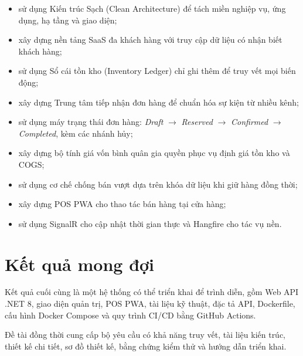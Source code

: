 \begin{itemize}
    \item sử dụng Kiến trúc Sạch (Clean Architecture) để tách miền nghiệp vụ, ứng dụng, hạ tầng và giao diện;
    \item xây dựng nền tảng SaaS đa khách hàng với truy cập dữ liệu có nhận biết khách hàng;
    \item sử dụng Sổ cái tồn kho (Inventory Ledger) chỉ ghi thêm để truy vết mọi biến động;
    \item xây dựng Trung tâm tiếp nhận đơn hàng để chuẩn hóa sự kiện từ nhiều kênh;
    \item sử dụng máy trạng thái đơn hàng: \textit{Draft} $\rightarrow$ \textit{Reserved}
          $\rightarrow$ \textit{Confirmed} $\rightarrow$ \textit{Completed}, kèm các nhánh hủy;
    \item xây dựng bộ tính giá vốn bình quân gia quyền phục vụ định giá tồn kho và COGS;
    \item sử dụng cơ chế chống bán vượt dựa trên khóa dữ liệu khi giữ hàng đồng thời;
    \item xây dựng POS PWA cho thao tác bán hàng tại cửa hàng;
    \item sử dụng SignalR cho cập nhật thời gian thực và Hangfire cho tác vụ nền.
\end{itemize}

\section{Kết quả mong đợi}

Kết quả cuối cùng là một hệ thống có thể triển khai để trình diễn, gồm Web API .NET 8,
giao diện quản trị, POS PWA, tài liệu kỹ thuật, đặc tả API, Dockerfile, cấu hình Docker Compose
và quy trình CI/CD bằng GitHub Actions.

Đề tài đồng thời cung cấp bộ yêu cầu có khả năng truy vết, tài liệu kiến trúc, thiết kế chi tiết,
sơ đồ thiết kế, bằng chứng kiểm thử và hướng dẫn triển khai.
